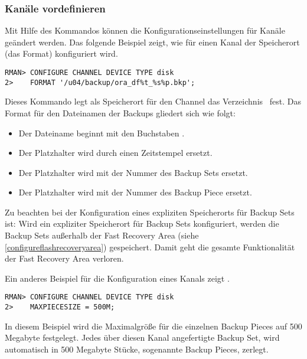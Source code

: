         \subsubsection{Kan\"ale vordefinieren}
          Mit Hilfe des Kommandos  k\"onnen die Konfigurationseinstellungen f\"ur Kan\"ale ge\"andert werden. Das folgende Beispiel zeigt, wie f\"ur einen Kanal der Speicherort (das Format) konfiguriert wird.
          \begin{lstlisting}[caption={Vordefinieren eines Channels mit Speicherort},label=admin1015,language=rman]
RMAN> CONFIGURE CHANNEL DEVICE TYPE disk
2>    FORMAT '/u04/backup/ora_df%t_%s%p.bkp';
          \end{lstlisting}
          Dieses Kommando legt als Speicherort f\"ur den Channel das Verzeichnis\  fest. Das Format f\"ur den Dateinamen der Backups gliedert sich wie folgt:
          \begin{itemize}
            \item Der Dateiname beginnt mit den Buchstaben .
            \item Der Platzhalter  wird durch einen Zeitstempel ersetzt.
            \item Der Platzhalter  wird mit der Nummer des Backup Sets ersetzt.
            \item Der Platzhalter  wird mit der Nummer des Backup Piece ersetzt.
          \end{itemize}

          \begin{merke}
            Zu beachten bei der Konfiguration eines expliziten Speicherorts f\"ur Backup Sets ist: Wird ein expliziter Speicherort f\"ur Backup Sets konfiguriert, werden die Backup Sets au\ss{}erhalb der Fast Recovery Area (siehe \ref{configureflashrecoveryarea}) gespeichert. Damit geht die gesamte Funktionalit\"at der Fast Recovery Area verloren.
          \end{merke}
          Ein anderes Beispiel f\"ur die Konfiguration eines Kanals zeigt .
          \begin{lstlisting}[caption={Ein vordefinierter Channel mit Backup Piece Size},label=admin1016,language=rman]
RMAN> CONFIGURE CHANNEL DEVICE TYPE disk
2>    MAXPIECESIZE = 500M;
          \end{lstlisting}
          In diesem Beispiel wird die Maximalgr\"o\ss{}e f\"ur die einzelnen Backup Pieces auf 500 Megabyte festgelegt.  Jedes \"uber diesen Kanal angefertigte Backup Set, wird automatisch in 500 Megabyte St\"ucke, sogenannte Backup Pieces, zerlegt.

